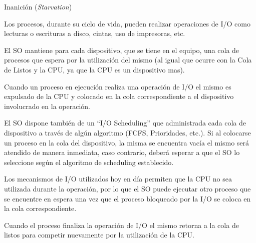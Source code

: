 \begin{questions}
\question Inanición (\textit{Starvation})

\question Los procesos, durante su ciclo de vida, pueden realizar operaciones de I/O como lecturas o escrituras a disco, cintas, uso de impresoras, etc.

\hspace{20pt} El SO mantiene para cada dispositivo, que se tiene en el equipo, una cola de procesos que espera por la utilización del mismo (al igual que ocurre con la Cola de Listos y la CPU, ya que la CPU es un dispositivo mas).

\hspace{20pt} Cuando un proceso en ejecución realiza una operación de I/O el mismo es expulsado de la CPU y colocado en la cola correspondiente a el dispositivo involucrado en la operación.

\hspace{20pt} El SO dispone también de un “I/O Scheduling” que administrada cada cola de dispositivo a través de algún algoritmo (FCFS, Prioridades, etc.). Si al colocarse un proceso en la cola del dispositivo, la misma se encuentra vacía el mismo será atendido de manera inmediata, caso contrario, deberá esperar a que el SO lo seleccione según el algoritmo de scheduling establecido.

\hspace{20pt} Los mecanismos de I/O utilizados hoy en día permiten que la CPU no sea utilizada durante la operación, por lo que el SO puede ejecutar otro proceso que se encuentre en espera una vez que el proceso bloqueado por la I/O se coloca en la cola correspondiente.

\hspace{20pt} Cuando el proceso finaliza la operación de I/O el mismo retorna a la cola de listos para competir nuevamente por la utilización de la CPU.


\end{questions}
